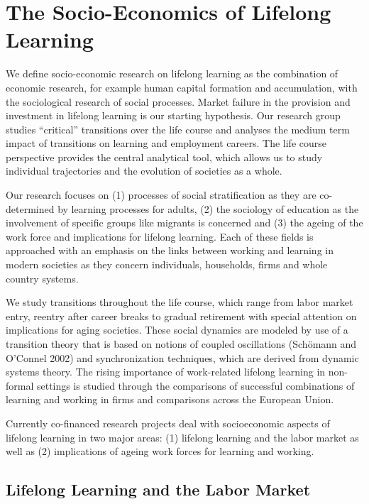 \section{The Socio-Economics of Lifelong Learning}

We define socio-economic research on lifelong learning as the combination of economic research, for example human capital formation and accumulation, with the sociological research of social processes. Market failure in the provision and investment in lifelong learning is our starting hypothesis. Our research group studies ``critical'' transitions over the life course and analyses the medium term impact of transitions on learning and employment careers. The life course perspective provides the central analytical tool, which allows us to study individual trajectories and the evolution of societies as a whole. 

 Our research focuses on (1) processes of social stratification as they are co-determined by learning processes for adults, (2) the sociology of education as the involvement of specific groups like migrants is concerned and (3) the ageing of the work force and implications for lifelong learning. Each of these fields is approached with an emphasis on the links between working and learning in modern societies as they concern individuals, households, firms and whole country systems. 

 We study transitions throughout the life course, which range from labor market entry, reentry after career breaks to gradual retirement with special attention on implications for aging societies. These social dynamics are modeled by use of a transition theory that is based on notions of coupled oscillations (Sch\"{o}mann and O'Connel 2002) and synchronization techniques, which are derived from dynamic systems theory. The rising importance of work-related lifelong learning in non-formal settings is studied through the comparisons of successful combinations of learning and working in firms and comparisons across the European Union. 

 Currently co-financed research projects deal with socioeconomic aspects of lifelong learning in two major areas: (1) lifelong learning and the labor market as well as (2) implications of ageing work forces for learning and working.

\subsection{Lifelong Learning and the Labor Market}

